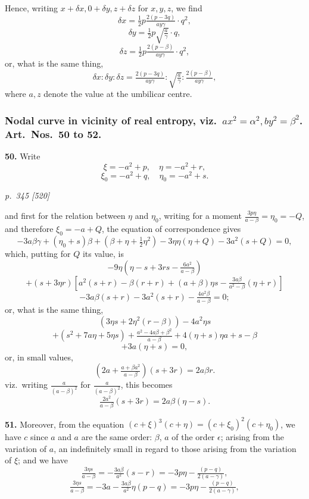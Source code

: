 \documentclass[11pt,a4paper]{book}
\begin{document}
Hence, writing $x + \delta x, 0 + \delta y, z + \delta z$ for $x, y, z$, we find
\[
\delta x = \tfrac{1}{2}p \tfrac{2(p - 3q)}{a y\gamma}\cdot q^2,
\]
\[
\delta y = \tfrac{1}{2}p\sqrt{\tfrac{a}{\gamma}}\cdot q,
\]
\[
\delta z = \tfrac{1}{2}p \tfrac{2(p - \beta)}{a y\gamma}\cdot q^2,
\]
or, what is the same thing,
\[
\delta x : \delta y : \delta z = \tfrac{2(p - 3q)}{a y\gamma} : \sqrt{\tfrac{a}{\gamma}} : \tfrac{2(p - \beta)}{a y\gamma},
\]
where $a, z$ denote the value at the umbilicar centre.

\subsubsection*{Nodal curve in vicinity of real entropy, viz.\ $a x^2 = \alpha^2, b y^2 = \beta^2$. Art.\ Nos.\ 50 to 52.}

\textbf{50.} Write
\[
\xi = -a^2 + p,\quad \eta = -a^2 + r,
\]
\[
\xi_0 = -a^2 + q,\quad \eta_0 = -a^2 + s.
\]

\clearpage

\bigskip
\textit{p.~345 [520]}
\smallskip

and first for the relation between $\eta$ and $\eta_0$, writing for a moment $\tfrac{3p\eta}{a - \beta} = \eta_0 = -Q$, and therefore $\xi_0 = -a + Q$, the equation of correspondence gives
\[
-3a\beta\gamma + (\eta_0 + s)\beta + (\beta + \eta + \tfrac{1}{2}\eta^2) - 3\eta\eta(\eta + Q) - 3a^2(s + Q) = 0,
\]
which, putting for $Q$ its value, is
\[
-9\eta(\eta - s + 3rs - \tfrac{6a^2}{a - \beta})
\]
\[
+ (s + 3\eta r)\!\left[a^2(s + r) - \beta(r + r) + (a + \beta)\eta s - \tfrac{3a\beta}{a^2 - \beta}(\eta + r)\right]
\]
\[
- 3a\beta(s + r) - 3a^2(s + r) - \tfrac{4a^2 \beta}{a - \beta} = 0;
\]
or, what is the same thing,
\[
(3\eta s + 2\eta^2(r - \beta)) - 4a^2\eta s
\]
\[
+ (s^2 + 7a\eta + 5\eta s) + \tfrac{a^2 - 4a\beta + \beta^2}{a - \beta} + 4(\eta + s)\eta a + s - \beta
\]
\[
+ 3a(\eta + s) = 0,
\]
or, in small values,
\[
\left(2a + \tfrac{a + \beta a^2}{a - \beta}\right)(s + 3r) = 2a\beta r.
\]
viz.\ writing $\tfrac{a}{(a - \beta)^2}$ for $\tfrac{a}{(a - \beta)^2}$, this becomes
\[
\tfrac{2a^2}{a - \beta}(s + 3r) = 2a\beta(\eta - s).
\]

\textbf{51.} Moreover, from the equation $(c + \xi)^3 (c + \eta) = (c + \xi_0)^2(c + \eta_0)$, we have $c$ since $a$ and $a$ are the same order: $\beta$, $a$ of the order $\epsilon$; arising from the variation of $a$, an indefinitely small in regard to those arising from the variation of $\xi$; and we have
\[
\tfrac{3\eta s}{a - \beta} = -\tfrac{3a\beta}{a^2}(s - r) = -3p\eta - \tfrac{(p - q)}{2(a - \gamma)},
\]
\[
\tfrac{3\eta s}{a - \beta} = -3a - \tfrac{3a\beta}{a^2}\eta(p - q) = -3p\eta - \tfrac{(p - q)}{2(a - \gamma)},
\]
\end{document}
